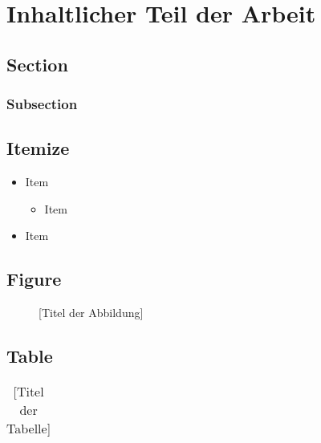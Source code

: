 \chapter{Inhaltlicher Teil der Arbeit}

	\lipsum[1]

	\section{Section}

		\lipsum[2]

		\subsection{Subsection}

			\lipsum[3]

	\section{Itemize}

	\begin{itemize}
		\item Item
		\begin{itemize}
			\item Item
		\end{itemize}
		\item Item
	\end{itemize}

	\section{Figure}

		\begin{figure}[ht]
			\begin{center}
				\caption{[Titel der Abbildung]}
				\label{fig:fig1}
			\end{center}
		\end{figure}

	\section{Table}

		\begin{table}[ht]
			\caption{[Titel der Tabelle]}
			\begin{center}
				\begin{tabular}{|c|c|}
				\end{tabular}
			\end{center}
			\label{tab:tab1}
		\end{table}

